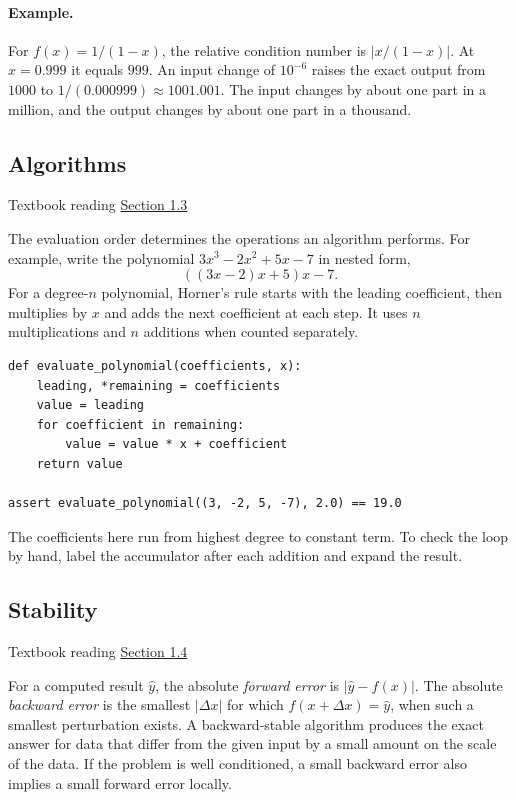\documentclass[11pt,letterpaper]{article}
\newcommand{\reading}[2]{\par\smallskip
  {\small Textbook reading \enspace\href{#1}{#2}}\par\medskip}
\begin{document}
\paragraph{Example.} For $f(x)=1/(1-x)$, the relative condition number is
$|x/(1-x)|$. At $x=0.999$ it equals $999$. An input change of $10^{-6}$
raises the exact output from $1000$ to $1/(0.000999)\approx1001.001$.
The input changes by about one part in a million, and the output changes
by about one part in a thousand.

\subsection{Algorithms}
\reading{https://fncbook.com/python/algorithms/}{Section 1.3}

The evaluation order determines the operations an algorithm performs. For
example, write the polynomial $3x^3-2x^2+5x-7$ in nested form,
\[
   ((3x-2)x+5)x-7.
\]
For a degree-$n$ polynomial, Horner's rule starts with the leading
coefficient, then multiplies by $x$ and adds the next coefficient at
each step. It uses $n$ multiplications and $n$ additions when counted
separately.

\begin{lstlisting}
def evaluate_polynomial(coefficients, x):
    leading, *remaining = coefficients
    value = leading
    for coefficient in remaining:
        value = value * x + coefficient
    return value

assert evaluate_polynomial((3, -2, 5, -7), 2.0) == 19.0
\end{lstlisting}

The coefficients here run from highest degree to constant term. To check
the loop by hand, label the accumulator after each addition and expand the
result.

\clearpage
\subsection{Stability}
\reading{https://fncbook.com/python/stability/}{Section 1.4}

For a computed result $\widehat{y}$, the absolute \emph{forward error} is
$|\widehat{y}-f(x)|$. The absolute \emph{backward error} is the smallest
$|\Delta x|$ for which $f(x+\Delta x)=\widehat{y}$, when such a smallest
perturbation exists. A backward-stable algorithm produces the exact
answer for data that differ from the given input by a small amount on
the scale of the data. If the problem is well conditioned, a small
backward error also implies a small forward error locally.
\end{document}
